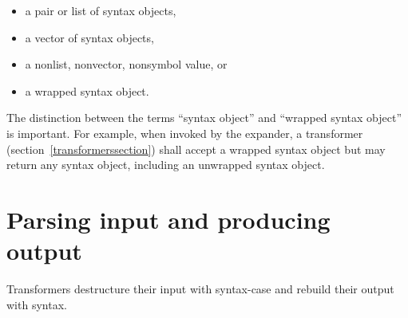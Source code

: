 \begin{itemize}
\item a pair or list of syntax objects,
\item a vector of syntax objects,
\item a nonlist, nonvector, nonsymbol value, or
\item a wrapped syntax object.
\end{itemize}

The distinction between the terms ``syntax object'' and ``wrapped syntax
object'' is important.
For example, when invoked by the expander, a transformer
(section~\ref{transformerssection}) shall accept a wrapped syntax object but
may return any syntax object, including an unwrapped syntax object.

\section{Parsing input and producing output}
\label{syntaxcasesection}

Transformers destructure their input with {\cf syntax-case} and rebuild
their output with {\cf syntax}.

